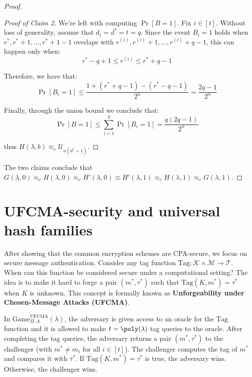 \documentclass[a4paper, 12pt]{report}
\begin{document}
\begin{proof}
\begin{proof}[Proof of Claim 2]
            We're left with computing $\Pr[B = 1]$. Fix $i \in [t]$. Without loss of generality, assume that $d_i = d^* = t = q$. Since the event $B_i = 1$ holds when $r^*, r^*+1, \ldots, r^*+1-1$ overlaps with $r^{(i)}, r^{(i)}+1, \ldots, r^{(i)}+q-1$, this can happen only when:
            \[r^*-q+1 \leq r^{(i)} \leq r^* + q-1\]

            Therefore, we have that:
            \[\Pr[B_i = 1] \leq \frac{1+(r^*+q-1)-(r^*-q-1)}{2^n} = \frac{2q-1}{2^n}\]

            Finally, through the union bound we conclude that:
            \[\Pr[B = 1] \leq \sum_{i = 1}^{q} \Pr[B_i = 1] = \frac{q(2q-1)}{2^n}\]

            thus $H(\lambda, b) \approx_c \mathcal{U}_{n(d^*+1)}$.
        \end{proof}

        The two claims conclude that $G(\lambda,0) \approx_c H(\lambda, 0) \approx_c H'(\lambda, 0) \equiv H'(\lambda, 1) \approx_c H(\lambda, 1) \approx_c G(\lambda, 1)$.
    \end{proof}

    \section{UFCMA-security and universal hash families}

    After showing that the common encryption schemes are CPA-secure, we focus on secure message authentication. Consider any tag function $\mathrm{Tag} : \mathcal{K} \times \mathcal{M} \to \mathcal{T}$. When can this function be considered secure under a computational setting? The idea is to make it hard to forge a pair $(m^*, \tau^*)$ such that $\mathrm{Tag}(K,m^*) = \tau^*$ when $K$ is unknown. This concept is formally known as \textbf{Unforgeability under Chosen-Message Attacks (UFCMA)}.

    In $\mathrm{Game}^{\text{UFCMA}}_{\Pi, A}(\lambda)$, the adversary is given access to an oracle for the $\mathrm{Tag}$ function and it is allowed to make $t = \poly(\lambda)$ tag queries to the oracle. After completing the tag queries, the adversary returns a pair $(m^*, \tau^*)$ to the challenger (with $m^* \neq m_i$ for all $i \in [t]$). The challenger computes the tag of $m^*$ and compares it with $\tau^*$. If $\mathrm{Tag}(K, m^*) = \tau^*$ is true, the adversary wins. Otherwise, the challenger wins.
\end{document}
